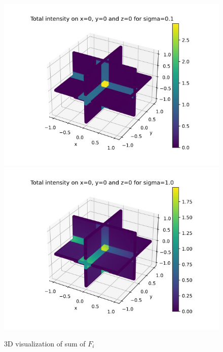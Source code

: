 \documentclass[11pt,titlepage]{article}
\begin{document}
\begin{figure}[H]
    \centering
    \caption{3D visualization of sum of $F_i$}
    \includegraphics[width=1.0\textwidth]{img/3d_sym_gauss_seidel_0.1.jpg}
    \label{fig:3d_0.1}
    \includegraphics[width=1.0\textwidth]{img/3d_sym_gauss_seidel_1.0.jpg}
    \label{fig:3d_1}
\end{figure}
\end{document}
